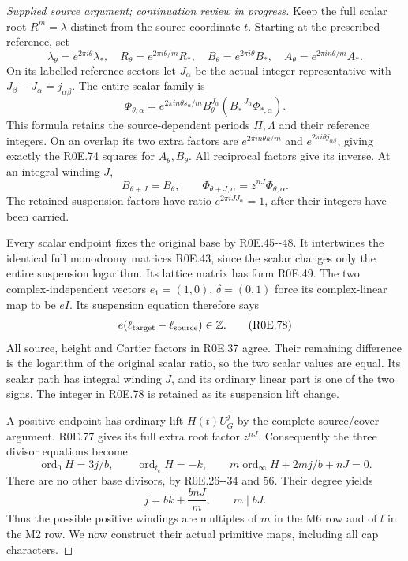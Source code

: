 \begin{proof}[Supplied source argument; continuation review in progress]
Keep the full scalar root \(R^m=\lambda\) distinct from the source
coordinate \(t\). Starting at the prescribed reference, set
\[
 \lambda_\theta=e^{2\pi i\theta}\lambda_*,
 \quad R_\theta=e^{2\pi i\theta/m}R_*,
 \quad B_\theta=e^{2\pi i\theta}B_*,
 \quad A_\theta=e^{2\pi i n\theta/m}A_*.
 \tag{R0E.75}
\]
On its labelled reference sectors let \(J_\alpha\) be the actual
integer representative with \(J_\beta-J_\alpha=j_{\alpha\beta}\).
The entire scalar family is
\[
 \Phi_{\theta,\alpha}
 =e^{2\pi i n\theta s_\alpha/m}
    B_\theta^{J_\alpha}
      (B_*^{-J_\alpha}\Phi_{*,\alpha}).
 \tag{R0E.76}
\]
This formula retains the source-dependent periods \(\Pi,\Lambda\)
and their reference integers. On an overlap its two extra factors
are \(e^{2\pi i n\theta k/m}\) and
\(e^{2\pi i\theta j_{\alpha\beta}}\), giving exactly the
R0E.74 squares for \(A_\theta,B_\theta\). All reciprocal factors
give its inverse. At an integral winding \(J\),
\[
 B_{\theta+J}=B_\theta,\qquad
 \Phi_{\theta+J,\alpha}=z^{nJ}\Phi_{\theta,\alpha}.
 \tag{R0E.77}
\]
The retained suspension factors have ratio
\(e^{2\pi iJ J_\alpha}=1\), after their integers have been carried.

Every scalar endpoint fixes the original base by R0E.45-\/-48.
It intertwines the identical full monodromy matrices R0E.43,
since the scalar changes only the entire suspension logarithm.
Its lattice matrix has form R0E.49. The two complex-independent
vectors \(e_1=(1,0)\), \(\delta=(0,1)\) force its complex-linear
map to be \(eI\). Its suspension equation therefore says
\[
             e(\ell_{\rm target}-\ell_{\rm source})\in\mathbb Z.
 \tag{R0E.78}
\]
All source, height and Cartier factors in R0E.37 agree. Their
remaining difference is the logarithm of the original scalar
ratio, so the two scalar values are equal. Its scalar path has
integral winding \(J\), and its ordinary linear part is one of
the two signs. The integer in R0E.78 is retained as its suspension
lift change.

A positive endpoint has ordinary lift \(H(t)U_G^j\) by the complete
source/cover argument. R0E.77 gives its full extra root factor
\(z^{nJ}\). Consequently the three divisor equations become
\[
 \operatorname{ord}_0H=3j/b,\qquad
 \operatorname{ord}_{t_c}H=-k,\qquad
 m\operatorname{ord}_\infty H+2mj/b+nJ=0.
 \tag{R0E.79}
\]
There are no other base divisors, by R0E.26-\/-34 and 56.
Their degree yields
\[
                   j=bk+\frac{bnJ}{m},\qquad m\mid bJ.
 \tag{R0E.80}
\]
Thus the possible positive windings are multiples of \(m\) in the
M6 row and of \(l\) in the M2 row. We now construct their actual
primitive maps, including all cap characters.


\end{proof}
